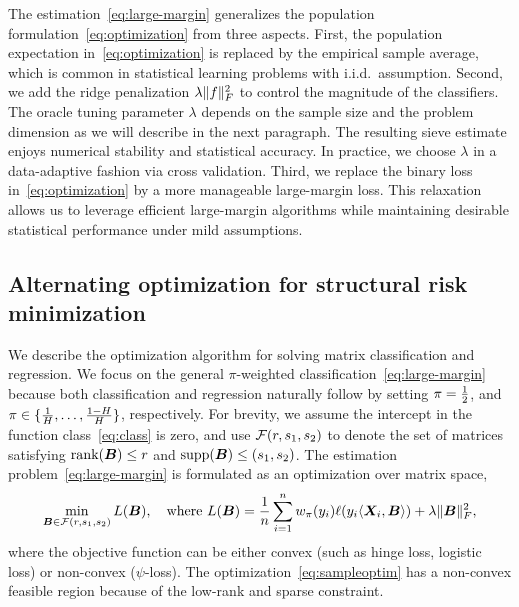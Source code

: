 \documentclass[11pt]{article}
\theoremstyle{plain}
\theoremstyle{definition}
\begin{document}
The estimation~\eqref{eq:large-margin} generalizes the population formulation~\eqref{eq:optimization} from three aspects. First, the population expectation in~\eqref{eq:optimization} is replaced by the empirical sample average, which is common in statistical learning problems with i.i.d.\ assumption. Second, we add the ridge penalization $\lambda\lVert f\rVert_F^2$ to control the magnitude of the classifiers. The oracle tuning parameter $\lambda$ depends on the sample size and the problem dimension as we will describe in the next paragraph. The resulting sieve estimate enjoys numerical stability and statistical accuracy. In practice, we choose $\lambda$ in a data-adaptive fashion via cross validation. Third, we replace the binary loss in~\eqref{eq:optimization} by a more manageable large-margin loss. This relaxation allows us to leverage efficient large-margin algorithms while maintaining desirable statistical performance under mild assumptions. 


\subsection{Alternating optimization for structural risk minimization}
We describe the optimization algorithm for solving matrix classification and regression. We focus on the general $\pi$-weighted classification~\eqref{eq:large-margin} because both classification and regression naturally follow by setting $\pi={1\over 2}$, and $\pi\in\{{1\over H},\ldots,{1-H\over H}\}$, respectively. For brevity, we assume the intercept in the function class~\eqref{eq:class} is zero, and use $\mathcal{F}(r,s_1,s_2)$ to denote the set of matrices satisfying $\text{rank}(\bm B)\leq r$ and $\text{supp}(\bm B)\leq (s_1,s_2)$. The estimation problem~\eqref{eq:large-margin} is formulated as an optimization over matrix space,
\begin{equation}\label{eq:sampleoptim}
\min_{\bm B \in \mathcal{F}(r,s_1,s_2)}L(\bm B),\quad \text{where }L(\bm B)={1\over n}\sum_{i=1}^nw_\pi(y_i)\ell(y_i\langle \bm X_i,\bm B \rangle) + \lambda\lVert\bm B\rVert_F^2,
\end{equation}
where the objective function can be either convex (such as hinge loss, logistic loss) or non-convex ($\psi$-loss). The optimization~\eqref{eq:sampleoptim} has a non-convex feasible region because of the low-rank and sparse constraint. 
\end{document}
